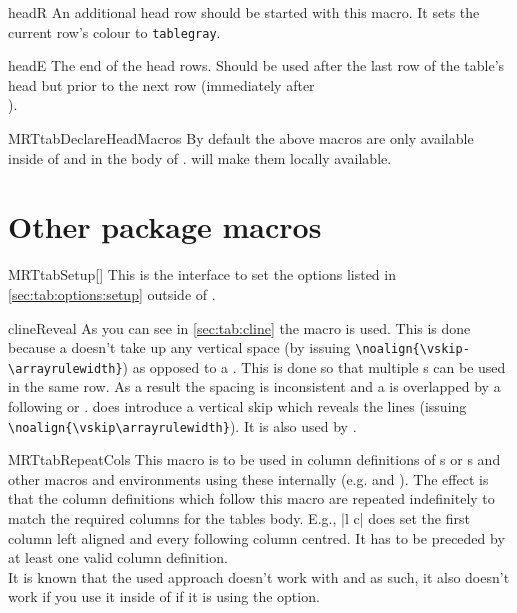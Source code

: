 \begin{describemacro}{headR}%
  An additional head row should be started with this macro. It sets the current
  row's colour to \texttt{tablegray}.
\end{describemacro}%

\begin{describemacro}{headE}%
  The end of the head rows. Should be used after the last row of the table's
  head but prior to the next row (immediately after \texttt{\string\\}).
\end{describemacro}%

\begin{describemacro}{MRTtabDeclareHeadMacros}%
  By default the above macros are only available inside of  and
  in the body of .  will make them
  locally available.
\end{describemacro}%

\section{Other package macros}%
\begin{describemacro}{MRTtabSetup}[]
  This is the interface to set the options listed in
  \autoref{sec:tab:options:setup} outside of .
\end{describemacro}

\begin{describemacro}{clineReveal}
  As you can see in \autoref{sec:tab:cline} the macro  is used.
  This is done because a  doesn't take up any vertical space (by
  issuing \verb|\noalign{\vskip-\arrayrulewidth}|) as opposed to a .
  This is done so that multiple s can be used in the same row. As a
  result the spacing is inconsistent and a  is overlapped by a
  following  or .  does introduce a
  vertical skip which reveals the lines (issuing
  \verb|\noalign{\vskip\arrayrulewidth}|).  It is also used by .
\end{describemacro}

\begin{describemacro}{MRTtabRepeatCols}
  This macro is to be used in column definitions of s or
  s and other macros and environments using these internally (e.g.
   and ). The effect is that the column
  definitions which follow this macro are repeated indefinitely to match the
  required columns for the tables body. E.g., \bverb|l \MRTtabRepeatCols c| does
  set the first column left aligned and every following column centred. It has
  to be preceded by at least one valid column definition.\\[\parskip]
  \dangerleft
  It is known that the used approach doesn't work with  and as
  such, it also doesn't work if you use it inside of  if it is
  using the  option.
\end{describemacro}

